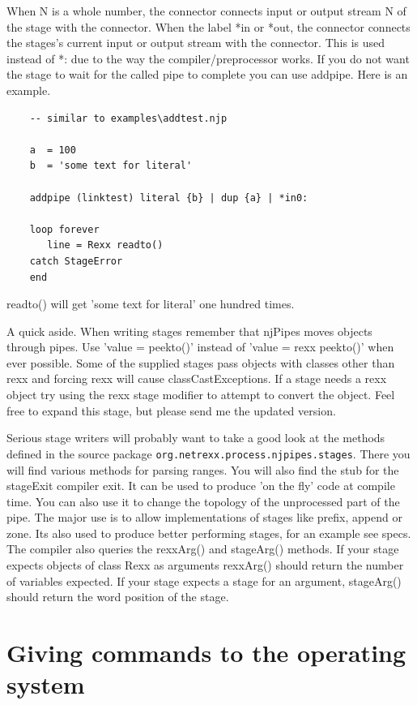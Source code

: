 When N is a whole number, the connector connects input or output stream N of the stage with the connector.
When the label *in or *out, the connector connects the stages's current input or output stream with the connector.  This is used instead of *: due to the way the compiler/preprocessor works.
If you do not want the stage to wait for the called pipe to complete you can use addpipe.  Here is an example.
\begin{lstlisting}
    -- similar to examples\addtest.njp

    a  = 100
    b  = 'some text for literal'

    addpipe (linktest) literal {b} | dup {a} | *in0:

    loop forever
       line = Rexx readto()
    catch StageError
    end
\end{lstlisting}
    readto() will get 'some text for literal' one hundred times.

A quick aside.  When writing stages remember that njPipes moves objects through pipes.  Use 'value = peekto()' instead of 'value = rexx peekto()' when ever possible.  Some of the supplied stages pass objects with classes other than rexx and forcing rexx will cause classCastExceptions. If a stage needs a rexx object try using the rexx stage modifier to attempt to convert the object.  Feel free to expand this stage, but please send me the updated version.

Serious stage writers will probably want to take a good look at the
methods defined in the \nr{} source package \texttt{org.netrexx.process.njpipes.stages}.  There you will find various methods for parsing ranges.  You will also find the stub for the stageExit compiler exit.  It can be used to produce 'on the fly' code at compile time.  You can also use it to change the topology of the unprocessed part of the pipe.  The major use is to allow implementations of stages like prefix, append or zone.  Its also used to produce better performing stages, for an example see specs.
The compiler also queries the rexxArg() and stageArg() methods.  If your stage expects objects of class Rexx as arguments rexxArg() should return the number of variables expected.  If your stage expects a stage for an argument, stageArg() should return the word position of the stage.

\chapter{Giving commands to the operating system}

